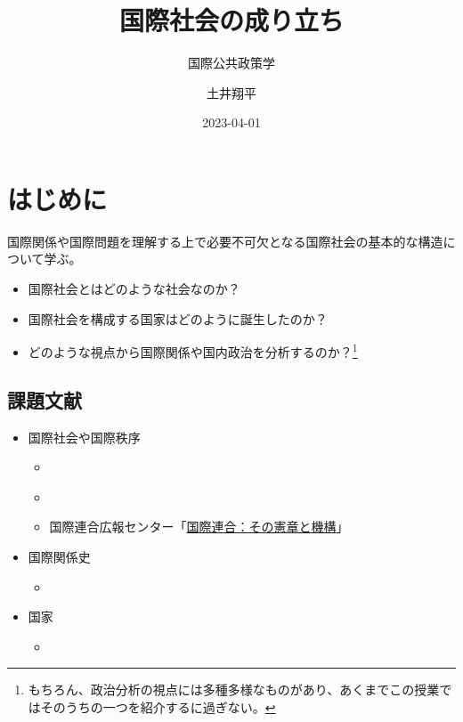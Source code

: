 \documentclass[
  xelatex,
  ja=standard]{bxjsarticle}
\title{国際社会の成り立ち}
\subtitle{国際公共政策学}
\author{土井翔平}
\date{2023-04-01}
\providecommand{\tightlist}{%
  \setlength{\itemsep}{0pt}\setlength{\parskip}{0pt}}\usepackage{longtable,booktabs,array}
\begin{document}
\maketitle
\ifdefined\Shaded\renewenvironment{Shaded}{\begin{tcolorbox}[sharp corners, frame hidden, interior hidden, breakable, enhanced, boxrule=0pt, borderline west={3pt}{0pt}{shadecolor}]}{\end{tcolorbox}}\fi

\hypertarget{ux306fux3058ux3081ux306b}{%
\section*{はじめに}\label{ux306fux3058ux3081ux306b}}

国際関係や国際問題を理解する上で必要不可欠となる国際社会の基本的な構造について学ぶ。

\begin{itemize}
\tightlist
\item
  国際社会とはどのような社会なのか？
\item
  国際社会を構成する国家はどのように誕生したのか？
\item
  どのような視点から国際関係や国内政治を分析するのか？\footnote{もちろん、政治分析の視点には多種多様なものがあり、あくまでこの授業ではそのうちの一つを紹介するに過ぎない。}
\end{itemize}

\hypertarget{ux8ab2ux984cux6587ux732e}{%
\subsection*{課題文献}\label{ux8ab2ux984cux6587ux732e}}

\begin{itemize}
\tightlist
\item
  国際社会や国際秩序

  \begin{itemize}
  \tightlist
  \item
    \citet[第3章]{nakanishi2013}
  \item
    \citet{shinoda2007}
  \item
    国際連合広報センター「\href{https://www.unic.or.jp/info/un/}{国際連合：その憲章と機構}」
  \end{itemize}
\item
  国際関係史

  \begin{itemize}
  \tightlist
  \item
    \citet[第2章]{nakanishi2013}
  \end{itemize}
\item
  国家

  \begin{itemize}
  \tightlist
  \item
    \citet[第2章]{sunahara2020}
  \end{itemize}
\end{itemize}
\end{document}
